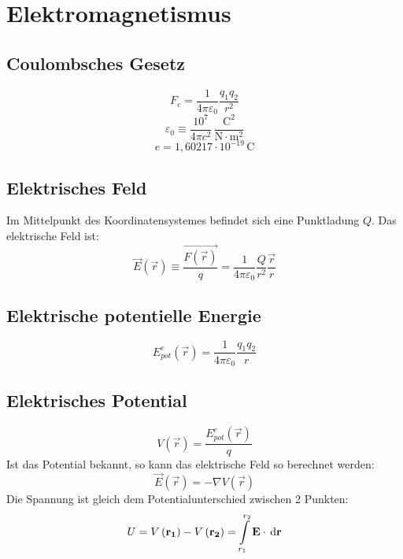 \section{Elektromagnetismus}
\subsection{Coulombsches Gesetz}
\begin{equation}
F_c = \frac{1}{4\pi\varepsilon_0}\frac{q_1 q_2}{r^2}
\end{equation}
\begin{equation}
\varepsilon_0 \equiv \frac{10^7}{4\pi c^2}\,\frac{\mathrm{C^2}}{\mathrm{N \cdot m^2}}
\end{equation}
\begin{equation}
e = 1,60217\cdot 10^{-19} \,\mathrm{C}
\end{equation}
\subsection{Elektrisches Feld}
Im Mittelpunkt des Koordinatensystemes befindet sich eine Punktladung $Q$. Das elektrische Feld ist:
\begin{equation}
\vec{E}\left(\vec{r}\right) \equiv \frac{\vec{F\left(\vec{r}\right)}}{q} = \frac{1}{4\pi\varepsilon_0}\frac{Q}{r^2}\frac{\vec{r}}{r}
\end{equation}
\subsection{Elektrische potentielle Energie}
\begin{equation}
E_{pot}^e\left(\vec{r}\right) = \frac{1}{4\pi\varepsilon_0}\frac{q_1 q_2}{r}
\end{equation}
\subsection{Elektrisches Potential}
\begin{equation}
V\left(\vec{r}\right) = \frac{E_{pot}^e\left(\vec{r}\right)}{q}
\end{equation}
Ist das Potential bekannt, so kann das elektrische Feld so berechnet werden:
\begin{equation}
\vec{E}\left(\vec{r}\right) = - \nabla V\left(\vec{r}\right)
\end{equation}
Die Spannung ist gleich dem Potentialunterschied zwischen 2 Punkten:
\begin{equation}
U = V\left(\mathbf{r_1}\right) - V\left(\mathbf{r_2}\right) = \int\limits_{r_1}^{r_2}\mathbf{E}\cdot \,\mathrm{d} \mathbf{r}
\end{equation}

